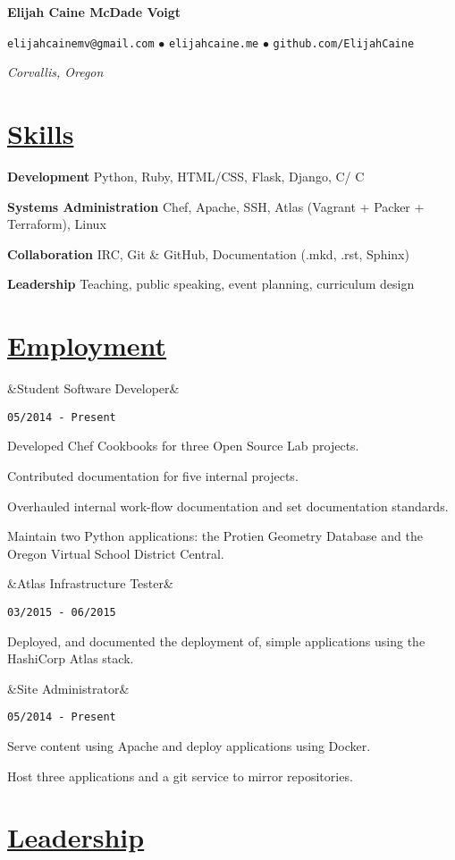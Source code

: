 \documentclass[11pt]{article}
\newcommand{\heading}[1]{
    \section*{\uline{\hfill #1}}
}
\newcommand{\squish}{
    \setlength{\itemsep}{0.5pt}
    \setlength{\parskip}{0pt}
    \setlength{\parsep}{0.5pt}
}
\newcommand{\when}[1]{
    \hfill \texttt{#1}
}
\newcommand{\experience}[3]{
    \ifx&#2&
        \item[{#1}]
    \else
        \item[{#1}, \emph{#2}]
    \fi
    \when{#3}
}
\newcommand{\contact}[4]{
    \centerline{
        \large       
        \texttt{#1}
        $\bullet$
        \texttt{#2}
        $\bullet$
        \texttt{#3}
    }
    \centerline{
        \emph{#4}
    }
}
\newcommand{\skill}[2]{
    \textbf{#1} \hfill #2
}
\newcommand{\CPP}{
    C\hspace{-.05em}\raisebox{.4ex}{\tiny\bf +}\hspace{-.10em}\raisebox{.4ex}{\tiny\bf +}
}
\begin{document}
\centerline{{\Huge \bf Elijah Caine McDade Voigt}}
\bigskip

\contact{elijahcainemv@gmail.com}
        {elijahcaine.me}
        {github.com/ElijahCaine}
        {Corvallis, Oregon}

\heading{Skills}%

\skill{Development}{Python, Ruby, HTML/CSS, Flask, Django, C/\CPP}

\skill{Systems Administration}{Chef, Apache, SSH,
Atlas (Vagrant + Packer + Terraform), Linux}

\skill{Collaboration}{IRC, Git \& GitHub, Documentation (.mkd, .rst, Sphinx)} 

\skill{Leadership}{Teaching, public speaking, event planning, curriculum
design}



\heading{Employment}%

\begin{description}
\squish

\experience{OSU Open Source Lab}
           {Student Software Developer}
           {05/2014 - Present}

    Developed Chef Cookbooks for three Open Source Lab projects.

    Contributed documentation for five internal projects.
    
    Overhauled internal work-flow documentation and set documentation standards.

    Maintain two Python applications: the Protien Geometry Database and the
    Oregon Virtual School District Central.

\experience{Hashi Scholars Participant}
           {Atlas Infrastructure Tester}
           {03/2015 - 06/2015}

    Deployed, and documented the deployment of, simple applications using the
    HashiCorp Atlas stack.

\experience{elijahcaine.me}
           {Site Administrator}
           {05/2014 - Present}

    Serve content using Apache and deploy applications using Docker.

    Host three applications and a git service to mirror repositories.


\end{description}



\heading{Leadership}%
\end{document}

